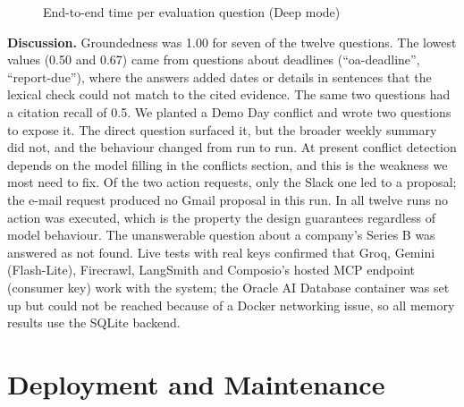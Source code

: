 \documentclass[oneside,a4paper,12pt]{report}
\begin{document}
\begin{figure}[!htbp]
\centering
{}
\caption{End-to-end time per evaluation question (Deep mode)}
\label{fig:chart-t}
\end{figure}

\textbf{Discussion.} Groundedness was 1.00 for seven of the twelve questions. The lowest values (0.50 and 0.67) came from questions about deadlines (``oa-deadline'', ``report-due''), where the answers added dates or details in sentences that the lexical check could not match to the cited evidence. The same two questions had a citation recall of 0.5. We planted a Demo Day conflict and wrote two questions to expose it. The direct question surfaced it, but the broader weekly summary did not, and the behaviour changed from run to run. At present conflict detection depends on the model filling in the conflicts section, and this is the weakness we most need to fix. Of the two action requests, only the Slack one led to a proposal; the e-mail request produced no Gmail proposal in this run. In all twelve runs no action was executed, which is the property the design guarantees regardless of model behaviour. The unanswerable question about a company's Series B was answered as not found. Live tests with real keys confirmed that Groq, Gemini (Flash-Lite), Firecrawl, LangSmith and Composio's hosted MCP endpoint (consumer key) work with the system; the Oracle AI Database container was set up but could not be reached because of a Docker networking issue, so all memory results use the SQLite backend.

\chapter{Deployment and Maintenance}
\label{ch:deploy}
\end{document}
